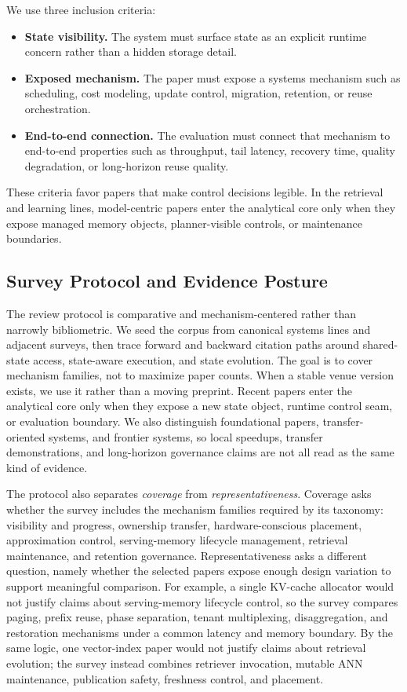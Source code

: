 \documentclass[manuscript,nonacm]{acmart}
\begin{document}
We use three inclusion criteria:
\begin{itemize}[leftmargin=*]
\item \textbf{State visibility.} The system must surface state as an explicit runtime concern rather than a hidden storage detail.
\item \textbf{Exposed mechanism.} The paper must expose a systems mechanism such as scheduling, cost modeling, update control, migration, retention, or reuse orchestration.
\item \textbf{End-to-end connection.} The evaluation must connect that mechanism to end-to-end properties such as throughput, tail latency, recovery time, quality degradation, or long-horizon reuse quality.
\end{itemize}
These criteria favor papers that make control decisions legible. In the retrieval and learning lines, model-centric papers enter the analytical core only when they expose managed memory objects, planner-visible controls, or maintenance boundaries.

\subsection{Survey Protocol and Evidence Posture}

The review protocol is comparative and mechanism-centered rather than narrowly bibliometric. We seed the corpus from canonical systems lines and adjacent surveys, then trace forward and backward citation paths around shared-state access, state-aware execution, and state evolution. The goal is to cover mechanism families, not to maximize paper counts. When a stable venue version exists, we use it rather than a moving preprint. Recent papers enter the analytical core only when they expose a new state object, runtime control seam, or evaluation boundary. We also distinguish foundational papers, transfer-oriented systems, and frontier systems, so local speedups, transfer demonstrations, and long-horizon governance claims are not all read as the same kind of evidence.

The protocol also separates \emph{coverage} from \emph{representativeness}. Coverage asks whether the survey includes the mechanism families required by its taxonomy: visibility and progress, ownership transfer, hardware-conscious placement, approximation control, serving-memory lifecycle management, retrieval maintenance, and retention governance. Representativeness asks a different question, namely whether the selected papers expose enough design variation to support meaningful comparison. For example, a single KV-cache allocator would not justify claims about serving-memory lifecycle control, so the survey compares paging, prefix reuse, phase separation, tenant multiplexing, disaggregation, and restoration mechanisms under a common latency and memory boundary. By the same logic, one vector-index paper would not justify claims about retrieval evolution; the survey instead combines retriever invocation, mutable ANN maintenance, publication safety, freshness control, and placement.
\end{document}
